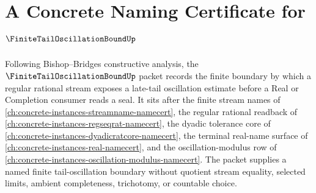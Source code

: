\chapter{A Concrete Naming Certificate for $\FiniteTailOscillationBoundUp$}
\label{ch:concrete-instances-finite-tail-oscillation-bound-namecert}

Following Bishop--Bridges constructive analysis, the $\FiniteTailOscillationBoundUp$ packet records the finite boundary by which a regular rational stream exposes a late-tail oscillation estimate before a Real or Completion consumer reads a seal. It sits after the finite stream names of \autoref{ch:concrete-instances-streamname-namecert}, the regular rational readback of \autoref{ch:concrete-instances-regseqrat-namecert}, the dyadic tolerance core of \autoref{ch:concrete-instances-dyadicratcore-namecert}, the terminal real-name surface of \autoref{ch:concrete-instances-real-namecert}, and the oscillation-modulus row of \autoref{ch:concrete-instances-oscillation-modulus-namecert}. The packet supplies a named finite tail-oscillation boundary without quotient stream equality, selected limits, ambient completeness, trichotomy, or countable choice.

